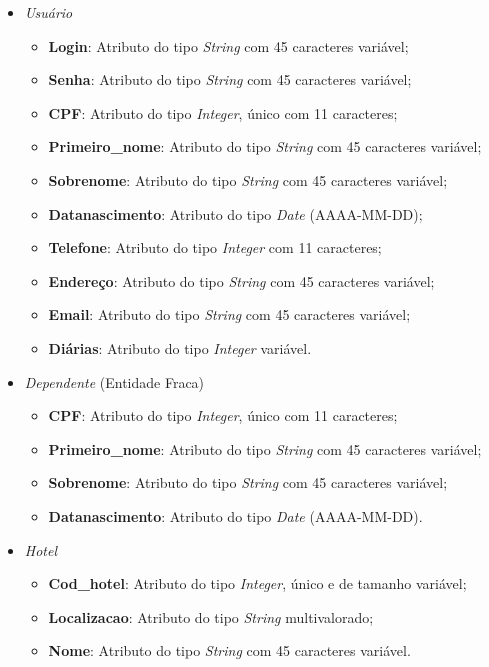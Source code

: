 \documentclass[a4paper, 12pt]{article}
\begin{document}
\begin{itemize}
    \item \emph{\large Usuário}
    \begin{itemize}
        \item \textbf{Login}: Atributo do tipo \emph{String} com 45 caracteres variável;
        \item \textbf{Senha}: Atributo do tipo \emph{String} com 45 caracteres variável;
        \item \textbf{CPF}: Atributo do tipo \emph{Integer}, único com 11 caracteres;
        \item \textbf{Primeiro\_nome}: Atributo do tipo \emph{String} com 45 caracteres variável;
        \item \textbf{Sobrenome}: Atributo do tipo \emph{String} com 45 caracteres variável;
        \item \textbf{Datanascimento}: Atributo do tipo \emph{Date} (AAAA-MM-DD);
        \item \textbf{Telefone}: Atributo do tipo \emph{Integer} com 11 caracteres;
        \item \textbf{Endereço}: Atributo do tipo \emph{String} com 45 caracteres variável;
        \item \textbf{Email}: Atributo do tipo \emph{String} com 45 caracteres variável;
        \item \textbf{Diárias}: Atributo do tipo \emph{Integer} variável.
    \end{itemize}
    
    \item \emph{\large Dependente} (Entidade Fraca)
    \begin{itemize}
        \item \textbf{CPF}: Atributo do tipo \emph{Integer}, único com 11 caracteres;
        \item \textbf{Primeiro\_nome}: Atributo do tipo \emph{String} com 45 caracteres variável;
        \item \textbf{Sobrenome}: Atributo do tipo \emph{String} com 45 caracteres variável;
        \item \textbf{Datanascimento}: Atributo do tipo \emph{Date} (AAAA-MM-DD).
    \end{itemize}

    \item \emph{\large Hotel}
    \begin{itemize}
        \item \textbf{Cod\_hotel}: Atributo do tipo \emph{Integer}, único e de tamanho variável;
        \item \textbf{Localizacao}: Atributo do tipo \emph{String} multivalorado;
        \item \textbf{Nome}: Atributo do tipo \emph{String} com 45 caracteres variável.
    \end{itemize}


\end{itemize}
\end{document}
